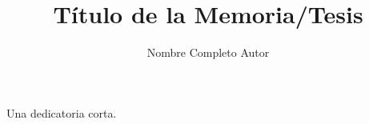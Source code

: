 \documentclass{umemoria}
\author{Nombre Completo Autor}
\title{Título de la Memoria/Tesis}
\begin{document}
\frontmatter
\maketitle

\begin{resumen}
\lipsum[1-4]
\end{resumen}


\begin{dedicatoria}
Una dedicatoria corta.
\end{dedicatoria}

\begin{thanks}
\lipsum[1-2]
\end{thanks}

\tableofcontents
\listoftables %
\listoffigures %

\mainmatter







\nocite{*}



\begin{appendices}

\end{appendices}
\end{document}
